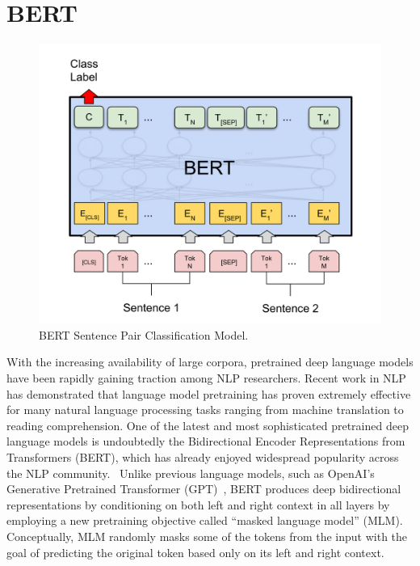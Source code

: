 \section{BERT}

\begin{figure}[b!]
\centering
  \includegraphics[width=5in]{classification.png}
\caption{BERT Sentence Pair Classification Model.}
\label{fig:bert}
\end{figure}

With the increasing availability of large corpora, pretrained deep language models have been rapidly gaining traction among NLP researchers.
Recent work in NLP has demonstrated that language model pretraining has proven extremely effective for many natural language processing tasks ranging from machine translation to reading comprehension.
One of the latest and most sophisticated pretrained deep language models is undoubtedly the Bidirectional Encoder Representations from Transformers (BERT), which has already enjoyed widespread popularity across the NLP community.~\cite{devlin2018bert}
Unlike previous language models, such as OpenAI's Generative Pretrained Transformer (GPT)~\cite{radford2019language}, BERT produces deep bidirectional representations by conditioning on both left and right context in all layers by employing a new pretraining objective called ``masked language model'' (MLM).
Conceptually, MLM randomly masks some of the tokens from the input with the goal of predicting the original token based only on its left and right context.

